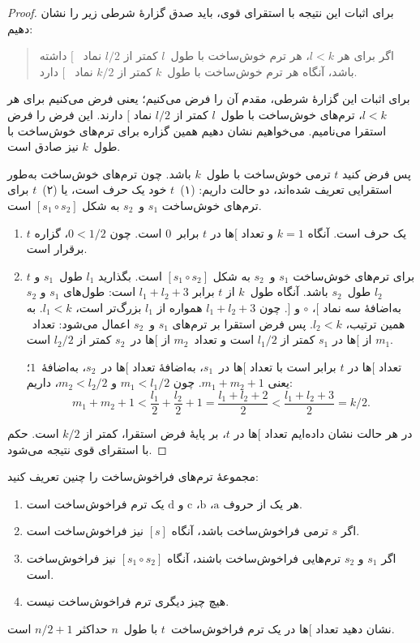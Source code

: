 \documentclass[../../../include/open-logic-section]{subfiles}
\begin{document}
\begin{proof}
برای اثبات این نتیجه با استقرای قوی، باید صدق گزارهٔ شرطی زیر را نشان
دهیم:
\begin{quote}
  اگر برای هر $l < k$، هر ترم خوش‌ساخت با طول~$l$ کمتر از $l/2$ نماد
  ~$[$ داشته باشد، آنگاه هر ترم خوش‌ساخت با طول~$k$ کمتر از $k/2$ نماد
  ~$[$ دارد.
\end{quote}
برای اثبات این گزارهٔ شرطی، مقدم آن را فرض می‌کنیم؛ یعنی فرض می‌کنیم
برای هر $l<k$، ترم‌های خوش‌ساخت با طول~$l$ کمتر از $l/2$ نماد $[$
دارند. این فرض را فرض استقرا می‌نامیم. می‌خواهیم نشان دهیم همین گزاره
برای ترم‌های خوش‌ساخت با طول~$k$ نیز صادق است.

پس فرض کنید $t$ ترمی خوش‌ساخت با طول~$k$ باشد. چون ترم‌های خوش‌ساخت
به‌طور استقرایی تعریف شده‌اند، دو حالت داریم: (۱)~$t$ خود یک حرف است،
یا (۲)~$t$ برای ترم‌های خوش‌ساخت $s_1$ و~$s_2$ به شکل
$[s_1 \circ s_2]$ است.
\begin{enumerate}
\item $t$ یک حرف است. آنگاه $k = 1$ و تعداد $[$ها در $t$ برابر~$0$
است. چون $0 < 1/2$، گزاره برقرار است.
\item $t$ برای ترم‌های خوش‌ساخت $s_1$ و~$s_2$ به شکل
  $[s_1 \circ s_2]$ است. بگذارید $l_1$ طول~$s_1$ و $l_2$ طول~$s_2$
  باشد. آنگاه طول~$k$ از $t$ برابر $l_1+l_2+3$ است: طول‌های $s_1$ و
  $s_2$ به‌اضافهٔ سه نماد $[$، $\circ$ و $]$. چون $l_1+l_2+3$ همواره
  از $l_1$ بزرگ‌تر است، $l_1 < k$. به همین ترتیب، $l_2 < k$. پس فرض
  استقرا بر ترم‌های $s_1$ و~$s_2$ اعمال می‌شود: تعداد~$m_1$ از $[$ها
  در $s_1$ کمتر از $l_1/2$ است و تعداد~$m_2$ از $[$ها در~$s_2$ کمتر
  از $l_2/2$ است.

  تعداد $[$ها در $t$ برابر است با تعداد $[$ها در~$s_1$، به‌اضافهٔ
  تعداد $[$ها در~$s_2$، به‌اضافهٔ~$1$؛ یعنی $m_1 + m_2 + 1$. چون
  $m_1 < l_1/2$ و $m_2 < l_2/2$، داریم:
  \[
  m_1 + m_2 + 1 < \frac{l_1}{2} + \frac{l_2}{2} + 1 = \frac{l_1+l_2+2}{2} < \frac{l_1+l_2+3}{2} = k/2.
  \]
\end{enumerate}
در هر حالت نشان داده‌ایم تعداد $[$ها در $t$، بر پایهٔ فرض استقرا،
کمتر از $k/2$ است. حکم با استقرای قوی نتیجه می‌شود.
\end{proof}

\begin{prob}
  مجموعهٔ ترم‌های فراخوش‌ساخت را چنین تعریف کنید:
  \begin{enumerate}
  \item هر یک از حروف $\mathrm{a}$، $\mathrm{b}$، $\mathrm{c}$ و
    $\mathrm{d}$ یک ترم فراخوش‌ساخت است.
  \item اگر $s$ ترمی فراخوش‌ساخت باشد، آنگاه $[s]$ نیز فراخوش‌ساخت است.
  \item اگر $s_1$ و $s_2$ ترم‌هایی فراخوش‌ساخت باشند، آنگاه
    $[s_1 \circ s_2]$ نیز فراخوش‌ساخت است.
  \item هیچ چیز دیگری ترم فراخوش‌ساخت نیست.
  \end{enumerate}
  نشان دهید تعداد $[$ها در یک ترم فراخوش‌ساخت~$t$ با طول~$n$ حداکثر
  $n/2 +1$ است.
\end{prob}
\end{document}
